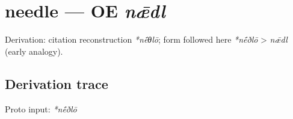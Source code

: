 \documentclass[
  british,
  a4paper,
  openany]{book}
\providecommand{\texorpdfstring}[2]{#1}
\begin{document}
\section{\texorpdfstring{needle --- OE
\emph{nǣdl}}{needle --- OE nǣdl}}\label{needle-oe-nux1e3dl}


Derivation: citation reconstruction \emph{*nḗθlō}; form followed here
\emph{*nḗðlō} \textgreater{} \emph{nǣdl} (early analogy).

\subsection{Derivation trace}\label{derivation-trace-91}

Proto input: \emph{*nḗðlō}

\begingroup
\setlength{\fboxsep}{6pt}
\end{document}
